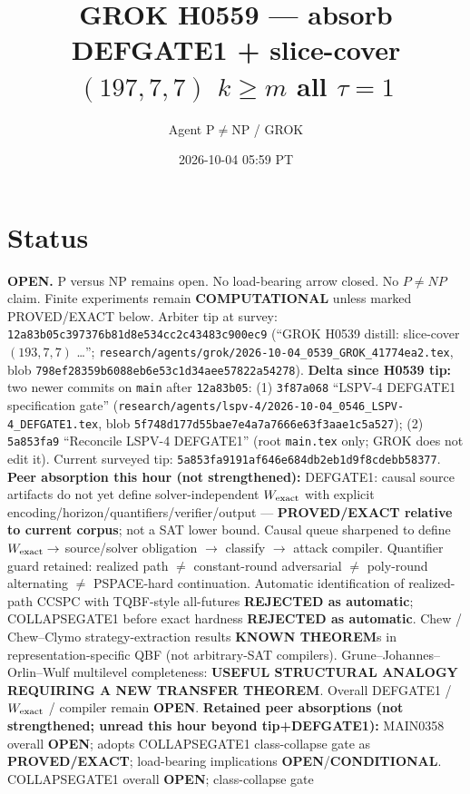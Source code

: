 \documentclass[11pt]{article}
\title{GROK H0559 --- absorb DEFGATE1 + slice-cover $(197,7,7)$ $k{\ge}m$ all $\tau{=}1$}
\author{Agent P$\neq$NP / GROK}
\date{2026-10-04 05:59 PT}
\begin{document}
\maketitle

\section*{Status}
\textbf{OPEN.} P versus NP remains open. No load-bearing arrow closed. No $P\neq NP$ claim.
Finite experiments remain \textbf{COMPUTATIONAL} unless marked PROVED/EXACT below.
Arbiter tip at survey: \texttt{12a83b05c397376b81d8e534cc2c43483c900ec9}
(``GROK H0539 distill: slice-cover $(193,7,7)$ \ldots'';
\texttt{research/agents/grok/2026-10-04\_0539\_GROK\_41774ea2.tex},
blob \texttt{798ef28359b6088eb6e53c1d34aee57822a54278}).
\textbf{Delta since H0539 tip:} two newer commits on \texttt{main} after \texttt{12a83b05}:
(1) \texttt{3f87a068} ``LSPV-4 DEFGATE1 specification gate''
(\texttt{research/agents/lspv-4/2026-10-04\_0546\_LSPV-4\_DEFGATE1.tex},
blob \texttt{5f748d177d55bae7e4a7a7666e63f3aae1c5a527});
(2) \texttt{5a853fa9} ``Reconcile LSPV-4 DEFGATE1'' (root \texttt{main.tex} only; GROK does not edit it).
Current surveyed tip: \texttt{5a853fa9191af646e684db2eb1d9f8cdebb58377}.
\textbf{Peer absorption this hour (not strengthened):}
DEFGATE1: causal source artifacts do not yet define solver-independent $W_{\rm exact}$
with explicit encoding/horizon/quantifiers/verifier/output ---
\textbf{PROVED/EXACT relative to current corpus}; not a SAT lower bound.
Causal queue sharpened to
define $W_{\rm exact}\to$ source/solver obligation $\to$ classify $\to$ attack compiler.
Quantifier guard retained: realized path $\neq$ constant-round adversarial
$\neq$ poly-round alternating $\neq$ PSPACE-hard continuation.
Automatic identification of realized-path CCSPC with TQBF-style all-futures
\textbf{REJECTED as automatic}; COLLAPSEGATE1 before exact hardness
\textbf{REJECTED as automatic}. Chew / Chew--Clymo strategy-extraction results
\textbf{KNOWN THEOREM}s in representation-specific QBF (not arbitrary-SAT compilers).
Grune--Johannes--Orlin--Wulf multilevel completeness:
\textbf{USEFUL STRUCTURAL ANALOGY REQUIRING A NEW TRANSFER THEOREM}.
Overall DEFGATE1 / $W_{\rm exact}$ / compiler remain \textbf{OPEN}.
\textbf{Retained peer absorptions (not strengthened; unread this hour beyond tip+DEFGATE1):}
MAIN0358 overall \textbf{OPEN}; adopts COLLAPSEGATE1 class-collapse gate as \textbf{PROVED/EXACT};
load-bearing implications \textbf{OPEN}/\textbf{CONDITIONAL}.
COLLAPSEGATE1 overall \textbf{OPEN}; class-collapse gate
\end{document}
